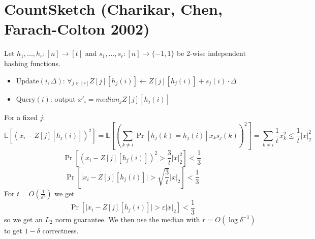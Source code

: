 \documentclass[11pt]{article}
\newcommand{\E}{{\mathbb E}}
\begin{document}
\section{CountSketch (Charikar, Chen, Farach-Colton 2002)}
Let $h_1, ..., h_r: [n] \rightarrow [t]$ and $s_1, ..., s_r: [n] \rightarrow \{-1, 1\}$ be 2-wise independent hashing functions.
\begin{itemize}
\item $\text{Update}(i, \Delta)$: $\forall_{j \in [r]} Z[j][h_j(i)] \leftarrow Z[j][h_j(i)] + s_j(i)\cdot \Delta$ 
\item $\text{Query}(i)$: output $x'_i = median_j Z[j][h_j(i)]$
\end{itemize}
For a fixed $j$:
$$ \E[ (x_i - Z[j][h_j(i)])^2 ] = \E\left[ \left(\sum_{k \neq i} \Pr[h_j(k)=h_j(i)] x_k s_j(k)\right)^2 \right] = \sum_{k \neq i} \frac{1}{t} x_k^2 
\le \frac{1}{t}|x|_2^2 $$
$$\Pr\left[ (x_i - Z[j][h_j(i)])^2 > \frac{3}{t} |x|_2^2 \right] < \frac{1}{3}$$
$$\Pr\left[ \big|x_i - Z[j][h_j(i)]\big| > \sqrt{\frac{3}{t}} |x|_2 \right] < \frac{1}{3} $$
For $t = O\left(\frac{1}{\varepsilon^2}\right)$ we get
$$\Pr\left[ \big|x_i - Z[j][h_j(i)]\big| > \varepsilon|x|_2\right] < \frac{1}{3}$$
so we get an $L_2$ norm guarantee. We then use the median with $r = O(\log\delta^{-1})$ to get $1-\delta$ correctness.
\end{document}
